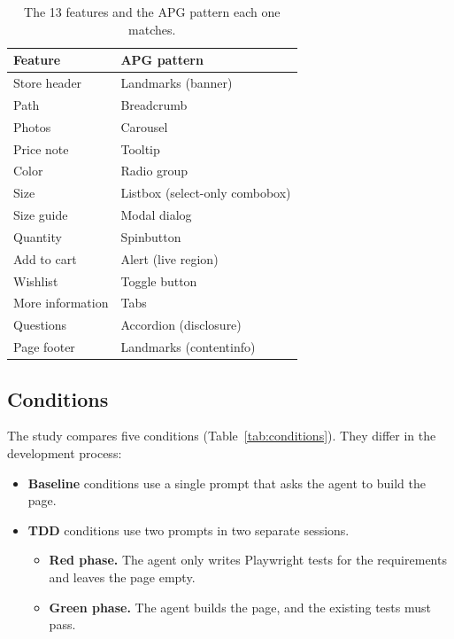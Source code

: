 \documentclass[conference]{IEEEtran}
\begin{document}
\begin{table}[t]
  \centering
  \caption{The 13 features and the APG pattern each one matches.}
  \label{tab:features}
  \begin{tabularx}{\columnwidth}{l X}
    \hline
    \textbf{Feature} & \textbf{APG pattern} \\
    \hline
    Store header & Landmarks (banner) \\
    Path & Breadcrumb \\
    Photos & Carousel \\
    Price note & Tooltip \\
    Color & Radio group \\
    Size & Listbox (select-only combobox) \\
    Size guide & Modal dialog \\
    Quantity & Spinbutton \\
    Add to cart & Alert (live region) \\
    Wishlist & Toggle button \\
    More information & Tabs \\
    Questions & Accordion (disclosure) \\
    Page footer & Landmarks (contentinfo) \\
    \hline
  \end{tabularx}
\end{table}

\subsection{Conditions}

The study compares five conditions (Table~\ref{tab:conditions}). They differ in the development process:
\begin{itemize}
  \item \textbf{Baseline} conditions use a single prompt that asks the agent to build the page.
  \item \textbf{TDD} conditions use two prompts in two separate sessions.
  \begin{itemize}
    \item \textbf{Red phase.} The agent only writes Playwright tests for the requirements and leaves the page empty.
    \item \textbf{Green phase.} The agent builds the page, and the existing tests must pass.
  \end{itemize}
\end{itemize}
\end{document}
